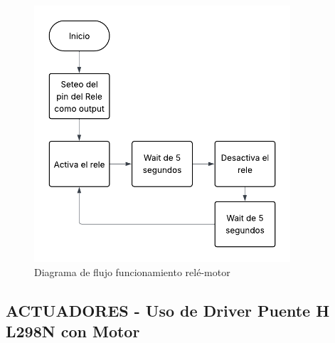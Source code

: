 \documentclass{article}
\begin{document}
\begin{figure}[H]
    \centering
    \includegraphics[width=0.85\textwidth]{./img/flujo_rele.png}
    \caption{Diagrama de flujo funcionamiento relé-motor}
    \label{fig:motor_driver}
\end{figure}


\subsection{ACTUADORES - Uso de Driver Puente H L298N con Motor}
\end{document}
